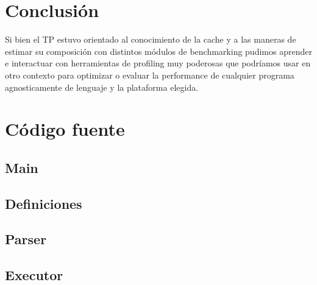 \documentclass[a4paper,10pt]{article}
\begin{document}
\section{Conclusión}

Si bien el TP estuvo orientado al conocimiento de la cache y a las maneras de estimar su composición con distintos módulos de benchmarking pudimos aprender e interactuar con herramientas de profiling muy poderosas que podríamos usar en otro contexto para optimizar o evaluar la performance de cualquier programa agnosticamente de lenguaje y la plataforma elegida.

\section{Código fuente}
\label{sec:code}

\subsection{Main}
\lstset{ language = C, numbers=left, tabsize=4, breaklines=true, frame=single }


\subsection{Definiciones}
\lstset{ language = C, numbers=left, tabsize=4, breaklines=true, frame=single }


\subsection{Parser}

\lstset{ language = C, numbers=left, tabsize=4, breaklines=true, frame=single }


\lstset{ language = C, numbers=left, tabsize=4, breaklines=true, frame=single }


\subsection{Executor}

\lstset{ language = C, numbers=left, tabsize=4, breaklines=true, frame=single }


\lstset{ language = C, numbers=left, tabsize=4, breaklines=true, frame=single }

\end{document}
